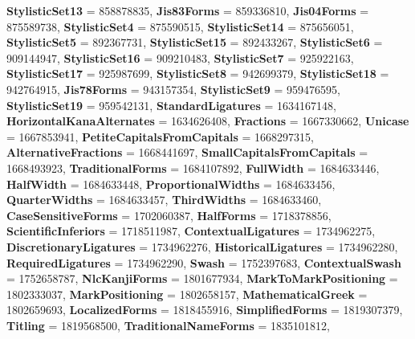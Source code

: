 \begin{DoxyCompactItemize}
\newline
{\bfseries Stylistic\+Set13} = 858878835, 
{\bfseries Jis83\+Forms} = 859336810, 
{\bfseries Jis04\+Forms} = 875589738, 
{\bfseries Stylistic\+Set4} = 875590515, 
\newline
{\bfseries Stylistic\+Set14} = 875656051, 
{\bfseries Stylistic\+Set5} = 892367731, 
{\bfseries Stylistic\+Set15} = 892433267, 
{\bfseries Stylistic\+Set6} = 909144947, 
\newline
{\bfseries Stylistic\+Set16} = 909210483, 
{\bfseries Stylistic\+Set7} = 925922163, 
{\bfseries Stylistic\+Set17} = 925987699, 
{\bfseries Stylistic\+Set8} = 942699379, 
\newline
{\bfseries Stylistic\+Set18} = 942764915, 
{\bfseries Jis78\+Forms} = 943157354, 
{\bfseries Stylistic\+Set9} = 959476595, 
{\bfseries Stylistic\+Set19} = 959542131, 
\newline
{\bfseries Standard\+Ligatures} = 1634167148, 
{\bfseries Horizontal\+Kana\+Alternates} = 1634626408, 
{\bfseries Fractions} = 1667330662, 
{\bfseries Unicase} = 1667853941, 
\newline
{\bfseries Petite\+Capitals\+From\+Capitals} = 1668297315, 
{\bfseries Alternative\+Fractions} = 1668441697, 
{\bfseries Small\+Capitals\+From\+Capitals} = 1668493923, 
{\bfseries Traditional\+Forms} = 1684107892, 
\newline
{\bfseries Full\+Width} = 1684633446, 
{\bfseries Half\+Width} = 1684633448, 
{\bfseries Proportional\+Widths} = 1684633456, 
{\bfseries Quarter\+Widths} = 1684633457, 
\newline
{\bfseries Third\+Widths} = 1684633460, 
{\bfseries Case\+Sensitive\+Forms} = 1702060387, 
{\bfseries Half\+Forms} = 1718378856, 
{\bfseries Scientific\+Inferiors} = 1718511987, 
\newline
{\bfseries Contextual\+Ligatures} = 1734962275, 
{\bfseries Discretionary\+Ligatures} = 1734962276, 
{\bfseries Historical\+Ligatures} = 1734962280, 
{\bfseries Required\+Ligatures} = 1734962290, 
\newline
{\bfseries Swash} = 1752397683, 
{\bfseries Contextual\+Swash} = 1752658787, 
{\bfseries Nlc\+Kanji\+Forms} = 1801677934, 
{\bfseries Mark\+To\+Mark\+Positioning} = 1802333037, 
\newline
{\bfseries Mark\+Positioning} = 1802658157, 
{\bfseries Mathematical\+Greek} = 1802659693, 
{\bfseries Localized\+Forms} = 1818455916, 
{\bfseries Simplified\+Forms} = 1819307379, 
\newline
{\bfseries Titling} = 1819568500, 
{\bfseries Traditional\+Name\+Forms} = 1835101812, 

\end{DoxyCompactItemize}
